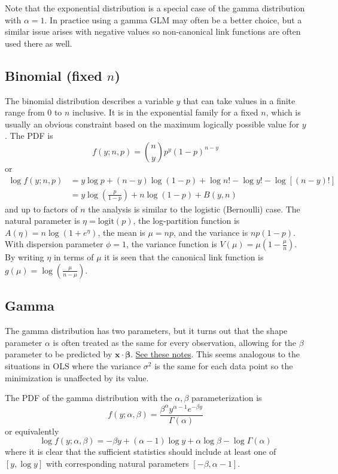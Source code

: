 \documentclass{article}
\newcommand{\bbeta}{\boldsymbol{\beta}}
\begin{document}
Note that the exponential distribution is a special case of the gamma
distribution with \(\alpha = 1\). In practice using a gamma GLM may often be a
better choice, but a similar issue arises with negative values so non-canonical
link functions are often used there as well.

\subsection{Binomial (fixed \(n\))}

The binomial distribution describes a variable \(y\) that can take values in a
finite range from \(0\) to \(n\) inclusive. It is in the exponential family
for a fixed \(n\), which is usually an obvious constraint based on the maximum
logically possible value for \(y\). The PDF is
\[ f(y; n, p) =
\binom{n}{y} p^y (1-p)^{n-y}
\]
or
\begin{align}
\log f(y; n, p) &= y \log p + (n-y) \log(1-p) + \log n! - \log y! - \log[(n-y)!] \\\
&= y \log \left( \frac{p}{1-p} \right) + n \log(1-p) + B(y, n)
\end{align}
and up to factors of \(n\) the analysis is similar to the logistic (Bernoulli)
case.
The natural parameter is \(\eta = \textrm{logit}(p)\), the log-partition
function is \(A(\eta) = n \log(1 + e^\eta)\), the mean is \(\mu = np\), and
the variance is \(np(1-p)\). With dispersion parameter \(\phi = 1\), the
variance function is \(V(\mu) = \mu\left(1 - \frac{\mu}{n}\right)\).
By writing \(\eta\) in terms of \(\mu\) it is seen that the canonical link
function is \(g(\mu) = \log\left( \frac{\mu}{n - \mu}\right) \).

\subsection{Gamma}
The gamma distribution has two parameters, but it turns out that the shape
parameter \(\alpha\) is often treated as the same for every observation, allowing
for the \(\beta\) parameter to be predicted by
\(\mathbf{x}\cdot\bbeta\).
\href{https://civil.colorado.edu/~balajir/CVEN6833/lectures/GammaGLM-01.pdf}{See these notes}.
This seems analogous to the situations in OLS where the variance \(\sigma^2\)
is the same for each data point so the minimization is unaffected by its value.

The PDF of the gamma distribution with the \(\alpha, \beta\) parameterization
is
\[ f(y; \alpha, \beta) = \frac{\beta^\alpha y^{\alpha-1} e^{-\beta y}}{\Gamma(\alpha)} \]
or equivalently
\[
\log f(y; \alpha, \beta) = -\beta y + (\alpha-1) \log y + \alpha \log \beta -
\log \Gamma(\alpha)
\]
where it is clear that the sufficient statistics should include at least one of
\([y, \log y]\) with corresponding natural parameters \([-\beta,
\alpha-1]\).
\end{document}
